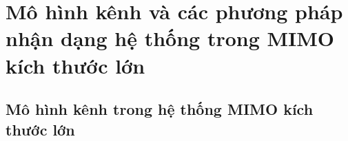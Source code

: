 \clearpage
{}

\setcounter{chapter}{0}
\chapter[MÔ HÌNH KÊNH VÀ CÁC PHƯƠNG PHÁP NHẬN DẠNG HỆ THỐNG TRONG MIMO KÍCH THƯỚC LỚN]{Mô hình kênh và các phương pháp nhận dạng hệ thống trong MIMO kích thước lớn}
\label{sec:back}

\section{Mô hình kênh trong hệ thống MIMO kích thước lớn}
\label{sec:channel_model}


